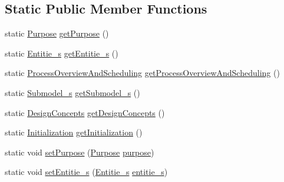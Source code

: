 \subsection*{Static Public Member Functions}
\begin{DoxyCompactItemize}
\item 
static \hyperlink{classit_1_1isislab_1_1masonhelperdocumentation_1_1_o_d_d_1_1_purpose}{Purpose} \hyperlink{classit_1_1isislab_1_1masonhelperdocumentation_1_1_o_d_d_1_1_o_d_d_aa537a775bb22e03b1a0b1a407a4fbd06}{get\-Purpose} ()
\item 
static \hyperlink{classit_1_1isislab_1_1masonhelperdocumentation_1_1_o_d_d_1_1_entitie__s}{Entitie\-\_\-s} \hyperlink{classit_1_1isislab_1_1masonhelperdocumentation_1_1_o_d_d_1_1_o_d_d_a42a9a6f8615c70c73034e5c23dd8eb0f}{get\-Entitie\-\_\-s} ()
\item 
static \hyperlink{classit_1_1isislab_1_1masonhelperdocumentation_1_1_o_d_d_1_1_process_overview_and_scheduling}{Process\-Overview\-And\-Scheduling} \hyperlink{classit_1_1isislab_1_1masonhelperdocumentation_1_1_o_d_d_1_1_o_d_d_a4d34153928ab00d1226f5634997ac74a}{get\-Process\-Overview\-And\-Scheduling} ()
\item 
static \hyperlink{classit_1_1isislab_1_1masonhelperdocumentation_1_1_o_d_d_1_1_submodel__s}{Submodel\-\_\-s} \hyperlink{classit_1_1isislab_1_1masonhelperdocumentation_1_1_o_d_d_1_1_o_d_d_aef8c41e667fde06c42bf1e06f95bd180}{get\-Submodel\-\_\-s} ()
\item 
static \hyperlink{classit_1_1isislab_1_1masonhelperdocumentation_1_1_o_d_d_1_1_design_concepts}{Design\-Concepts} \hyperlink{classit_1_1isislab_1_1masonhelperdocumentation_1_1_o_d_d_1_1_o_d_d_a4177c47f02357b7b48d03c88571f26e1}{get\-Design\-Concepts} ()
\item 
static \hyperlink{classit_1_1isislab_1_1masonhelperdocumentation_1_1_o_d_d_1_1_initialization}{Initialization} \hyperlink{classit_1_1isislab_1_1masonhelperdocumentation_1_1_o_d_d_1_1_o_d_d_a2d557024511c26262b62b70f540ea37e}{get\-Initialization} ()
\item 
static void \hyperlink{classit_1_1isislab_1_1masonhelperdocumentation_1_1_o_d_d_1_1_o_d_d_a66517a4cbba6bd0e8f78de067ff6c2ac}{set\-Purpose} (\hyperlink{classit_1_1isislab_1_1masonhelperdocumentation_1_1_o_d_d_1_1_purpose}{Purpose} \hyperlink{classit_1_1isislab_1_1masonhelperdocumentation_1_1_o_d_d_1_1_o_d_d_a81602d5a0bf0650c69808c4188b4319e}{purpose})
\item 
static void \hyperlink{classit_1_1isislab_1_1masonhelperdocumentation_1_1_o_d_d_1_1_o_d_d_a8a420941f475b967033b7ef1ecfc73d8}{set\-Entitie\-\_\-s} (\hyperlink{classit_1_1isislab_1_1masonhelperdocumentation_1_1_o_d_d_1_1_entitie__s}{Entitie\-\_\-s} \hyperlink{classit_1_1isislab_1_1masonhelperdocumentation_1_1_o_d_d_1_1_o_d_d_a83f519302af9e043ba9504d5da426410}{entitie\-\_\-s})

\end{DoxyCompactItemize}

